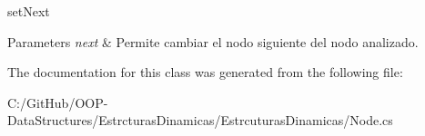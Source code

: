 set\+Next 


\begin{DoxyParams}{Parameters}
{\em next} & Permite cambiar el nodo siguiente del nodo analizado.\\
\hline
\end{DoxyParams}


The documentation for this class was generated from the following file\+:\begin{DoxyCompactItemize}
\item 
C\+:/\+Git\+Hub/\+O\+O\+P-\/\+Data\+Structures/\+Estrcturas\+Dinamicas/\+Estrcuturas\+Dinamicas/Node.\+cs\end{DoxyCompactItemize}
